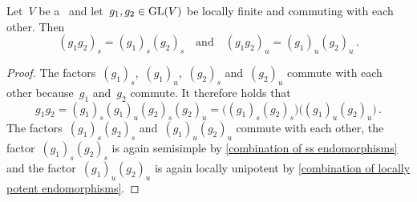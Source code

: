 \begin{lemma}
  \label{local mjcd for commuting endomorphisms}
  Let~$V$ be a~{\kvs} and let~$g_1, g_2 \in \operatorname{GL}(V)$ be locally finite and commuting with each other.
  Then
  \[
      ( g_1 g_2 )_s
    = ( g_1 )_s ( g_2 )_s
    \quad\text{and}\quad
      ( g_1 g_2 )_u
    = ( g_1 )_u ( g_2 )_u \,.
  \]
\end{lemma}


\begin{proof}
  The factors~$(g_1)_s$,~$(g_1)_u$,~$(g_2)_s$ and~$(g_2)_u$ commute with each other because~$g_1$ and~$g_2$ commute.
  It therefore holds that
  \[
      g_1 g_2
    = (g_1)_s (g_1)_u (g_2)_s (g_2)_u
    = \bigl( (g_1)_s (g_2)_s \bigr) \bigl( (g_1)_u (g_2)_u \bigr) \,.
  \]
  The factors~$(g_1)_s (g_2)_s$ and~$(g_1)_u (g_2)_u$ commute with each other, the factor~$(g_1)_s (g_2)_s$ is again semisimple by \cref{combination of ss endomorphisms} and the factor~$(g_1)_u (g_2)_u$ is again locally unipotent by \cref{combination of locally potent endomorphisms}.
\end{proof}




